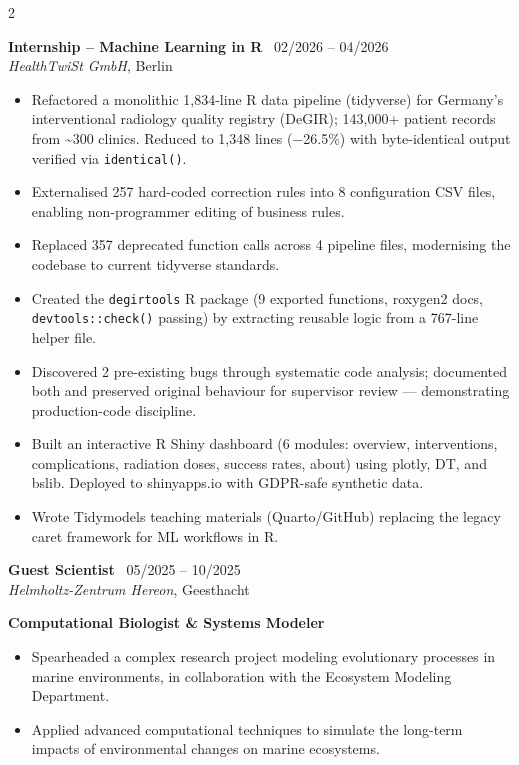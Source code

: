 \documentclass[11pt,a4paper]{article}
\newcommand{\jobitem}[4]{
    \noindent
    \textbf{#1} \hfill {\footnotesize \faCalendar* \ #4} \\
    {\color{lighttextcol} \textit{#2}, #3}
    \vspace{0.1cm}
}
\begin{document}
\begin{paracol}{2}
    \jobitem{Internship -- Machine Learning in R}{HealthTwiSt GmbH}{Berlin}{02/2026 -- 04/2026}
    \begin{itemize}
                   \item Refactored a monolithic 1,834-line R data pipeline (tidyverse) for Germany's interventional radiology quality registry (DeGIR); 143,000+ patient records from \textasciitilde300 clinics. Reduced to 1,348 lines ($-$26.5\%) with byte-identical output verified via \texttt{identical()}.
                   \item Externalised 257 hard-coded correction rules into 8 configuration CSV files, enabling non-programmer editing of business rules.
                   \item Replaced 357 deprecated function calls across 4 pipeline files, modernising the codebase to current tidyverse standards.
                   \item Created the \texttt{degirtools} R package (9 exported functions, roxygen2 docs, \texttt{devtools::check()} passing) by extracting reusable logic from a 767-line helper file.
                   \item Discovered 2 pre-existing bugs through systematic code analysis; documented both and preserved original behaviour for supervisor review --- demonstrating production-code discipline.
                   \item Built an interactive R Shiny dashboard (6 modules: overview, interventions, complications, radiation doses, success rates, about) using plotly, DT, and bslib. Deployed to shinyapps.io with GDPR-safe synthetic data.
                   \item Wrote Tidymodels teaching materials (Quarto/GitHub) replacing the legacy caret framework for ML workflows in R.
               \end{itemize}
    
    \jobitem{Guest Scientist}{Helmholtz-Zentrum Hereon}{Geesthacht}{05/2025 -- 10/2025}
    \textbf{Computational Biologist \& Systems Modeler}
    \begin{itemize}[leftmargin=*,noitemsep,topsep=0pt,label=\textcolor{maincol}{\tiny\faCircle}]
        \item Spearheaded a complex research project modeling evolutionary processes in marine environments, in collaboration with the Ecosystem Modeling Department.
        \item Applied advanced computational techniques to simulate the long-term impacts of environmental changes on marine ecosystems.
    \end{itemize}
    

\end{paracol}
\end{document}
